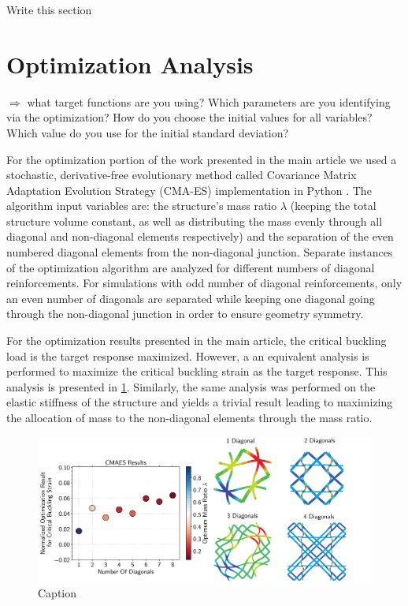 \documentclass[10pt,twoside]{fernandes_supp}
\newcommand{\KB}[1]{\noindent\color{blue}$\Longrightarrow$ #1\normalcolor}
\newcommand{\mf}[1]{\colorbox{blue!10}{\color{color3}#1}}
\begin{document}
\mf{Write this section}

\section{Optimization Analysis}

\KB{what target functions are you using? Which parameters are you identifying via the optimization? How do you choose the initial values for all variables? Which value do you use for the initial standard deviation?}

For the optimization portion of the work presented in the main article we used a stochastic, derivative-free evolutionary method called Covariance Matrix Adaptation Evolution Strategy (CMA-ES) implementation in Python \citep{hansen2003}. The algorithm input variables are: the structure's mass ratio $\lambda$ (keeping the total structure volume constant, as well as distributing the mass evenly through all diagonal and non-diagonal elements respectively) and the separation of the even numbered diagonal elements from the non-diagonal junction. Separate instances of the optimization algorithm are analyzed for different numbers of diagonal reinforcements. For simulations with odd number of diagonal reinforcements, only an even number of diagonals are separated while keeping one diagonal going through the non-diagonal junction in order to ensure geometry symmetry. 

For the optimization results presented in the main article, the critical buckling load is the target response maximized. However, a an equivalent analysis is performed to maximize the critical buckling strain as the target response. This analysis is presented in \cref{BucklingOptimization}. Similarly, the same analysis was performed on the elastic stiffness of the structure and yields a trivial result leading to maximizing the allocation of mass to the non-diagonal elements through the mass ratio.

\begin{figure}[H]
    \centering
    \includegraphics[width=0.9\linewidth]{SFig6.png}
    \caption{Caption}
    \label{BucklingOptimization}
\end{figure}
\end{document}
